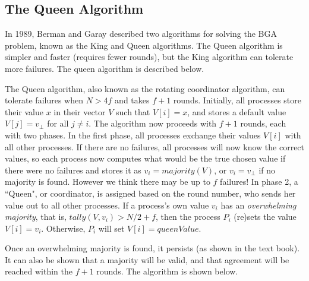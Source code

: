 \documentclass[twoside]{article}
\begin{document}
\subsection{The Queen Algorithm}
In 1989, Berman and Garay \cite{Berman:1989:AOD:646243.681443, Berman:1989:TOD:1398514.1398724} described two algorithms for solving the BGA problem, known as the King and Queen algorithms. The Queen algorithm is simpler and faster (requires fewer rounds), but the King algorithm can tolerate more failures. The queen algorithm is described below.

The Queen algorithm, also known as the rotating coordinator algorithm, can tolerate failures when $N > 4f$ and takes $f+1$ rounds. Initially, all processes store their value $x$ in their vector $V$ such that $V[i] = x$, and stores a default value $V[j]=v_\perp$ for all $j\neq i$. The algorithm now proceeds with $f+1$ rounds, each with two phases. In the first phase, all processes exchange their values $V[i]$ with all other processes. If there are no failures, all processes will now know the correct values, so each process now computes what would be the true chosen value if there were no failures and stores it as $v_i = majority(V)$, or $v_i = v_\perp$ if no majority is found. However we think there may be up to $f$ failures! In phase 2, a ``Queen", or coordinator, is assigned based on the round number, who sends her value out to all other processes. If a process's own value $v_i$ has an \textit{overwhelming majority}, that is, $tally(V,v_i) > N/2 + f$, then the process $P_i$ (re)sets the value $V[i] = v_i$. Otherwise, $P_i$ will set $V[i] = queenValue$.

Once an overwhelming majority is found, it persists (as shown in the text book). It can also be shown that a majority will be valid, and that agreement will be reached within the $f+1$ rounds. The algorithm is shown below.
\end{document}

